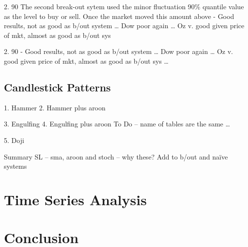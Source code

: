 

2.	90%
The second break-out sytem used the minor fluctuation 90\% quantile value as the level to buy or sell. Once the market moved this amount above
-	Good results, not as good as b/out system … Dow poor again … Oz v. good given price of mkt, almost as good as b/out sys 

2.	90%
-	Good results, not as good as b/out system … Dow poor again … Oz v. good given price of mkt, almost as good as b/out sys …

\subsection{Candlestick Patterns}
1.	Hammer
2.	Hammer plus aroon

3.	Engulfing
4.	Engulfing plus aroon
To Do – name of tables are the same …

5.	Doji


Summary
SL – sma, aroon and stoch – why these?  Add to b/out and naïve systems



\section{Time Series Analysis}



\section{Conclusion}



